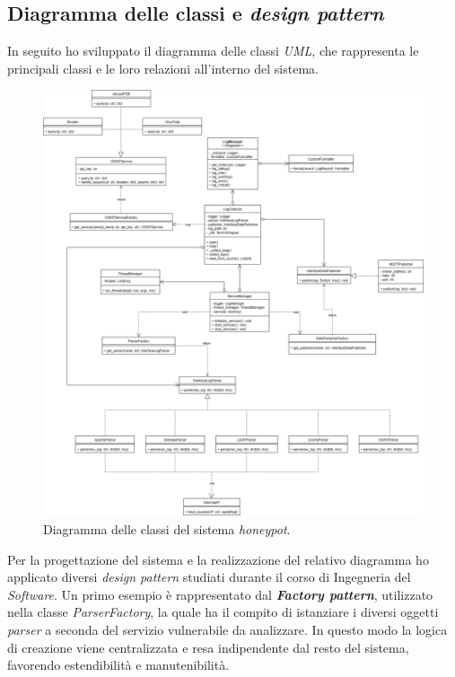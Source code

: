 \subsection*{Diagramma delle classi e \textit{design pattern}}
\label{design-pattern}
In seguito ho sviluppato il diagramma delle classi \textit{UML}, che rappresenta le principali classi e le loro relazioni all'interno del sistema.
\begin{figure}[H]
    \begin{center}
    \includegraphics[width=\textwidth]{img/Diagramma-classi.png}
    \caption{Diagramma delle classi del sistema \textit{honeypot}.}
    \label{fig:class-diagram}
    \end{center}
\end{figure}
Per la progettazione del sistema e la realizzazione del relativo diagramma ho applicato diversi \textit{design pattern} studiati durante il corso di Ingegneria del \textit{Software}. 
Un primo esempio è rappresentato dal \textbf{\textit{Factory pattern}}, utilizzato nella classe \textit{ParserFactory}, la quale ha il compito di istanziare i diversi oggetti \textit{parser} a seconda del servizio vulnerabile da analizzare. 
In questo modo la logica di creazione viene centralizzata e resa indipendente dal resto del sistema, favorendo estendibilità e manutenibilità. 
